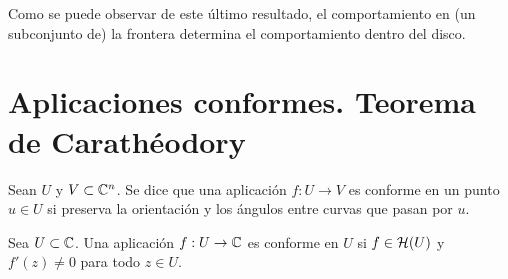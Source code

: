Como se puede observar de este último resultado, el comportamiento en (un subconjunto de) la frontera determina el comportamiento dentro del disco. \\

\section{Aplicaciones conformes. Teorema de Carathéodory}


\begin{definition}%
    Sean $U$ y $V \subset \mathbb{C}^n$. Se dice que una aplicación $f: U \to V$ es conforme en un punto $u \in U$ si preserva la orientación y los ángulos entre curvas que pasan por $u$. \\
\end{definition}

\begin{prop}
    Sea $U \subset \mathbb{C}$. Una aplicación $f: U \to \mathbb{C}$ es conforme en $U$ si $f \in \mathcal{H}(U)$ y $f'(z) \not = 0$ para todo $z \in U$.
\end{prop}

